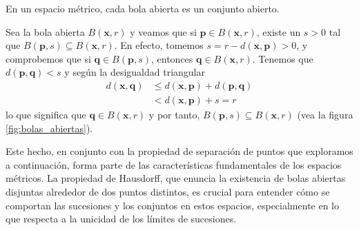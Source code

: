 \newpage
{}

\begin{theorem}{}{}
    En un espacio métrico, cada bola abierta es un conjunto abierto.

    \tcblower
    \demostracion Sea la bola abierta $B(\mathbf{x}, r)$ y veamos que si $\mathbf{p} \in B(\mathbf{x}, r)$, existe un $s > 0$ tal que $B(\mathbf{p},s) \subseteq B(\mathbf{x}, r)$. En efecto, tomemos $s = r - d(\mathbf{x},\mathbf{p}) > 0$, y comprobemos que si $\mathbf{q} \in B(\mathbf{p}, s)$, entonces $\mathbf{q} \in B(\mathbf{x}, r)$. Tenemos que $d(\mathbf{p}, \mathbf{q}) < s$ y según la desigualdad triangular
    \begin{align*}
        d(\mathbf{x},\mathbf{q}) & \leq d(\mathbf{x},\mathbf{p}) + d(\mathbf{p},\mathbf{q}) \\
        & < d(\mathbf{x},\mathbf{p}) + s = r
    \end{align*}
    lo que significa que $\mathbf{q} \in B(\mathbf{x}, r)$ y por tanto, $B(\mathbf{p}, s) \subseteq B(\mathbf{x},r)$ (vea la figura \ref{fig:bolas_abiertas}).
\end{theorem}

Este hecho, en conjunto con la propiedad de separación de puntos que exploramos a continuación, forma parte de las características fundamentales de los espacios métricos. La propiedad de Hausdorff, que enuncia la existencia de bolas abiertas disjuntas alrededor de dos puntos distintos, es crucial para entender cómo se comportan las sucesiones y los conjuntos en estos espacios, especialmente en lo que respecta a la unicidad de los límites de sucesiones.

